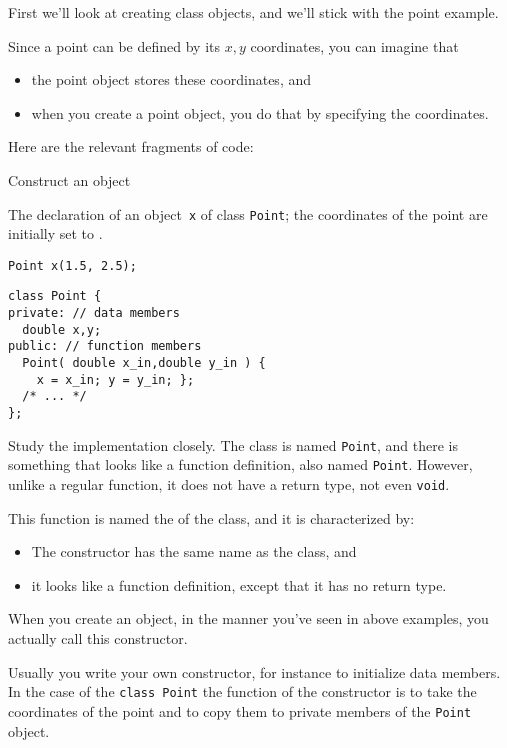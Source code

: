 First we'll look at creating class objects,
and we'll stick with the point example.

Since a point can be defined by its $x,y$ coordinates,
you can imagine that
\begin{itemize}
\item
  the point object stores these coordinates, and
\item when you create a point object, you do that by
  specifying the coordinates.
\end{itemize}

Here are the relevant fragments of code:
\begin{block}{Construct an object}
  \label{sl:point-construct-use}
\begin{multicols}{2}
  The declaration of an object~\lstinline{x}
  of class \lstinline+Point+;
  the coordinates of the point are initially
  set to .
\begin{lstlisting}
Point x(1.5, 2.5);
\end{lstlisting}
%
\columnbreak
%
\begin{lstlisting}
class Point {
private: // data members
  double x,y;
public: // function members
  Point( double x_in,double y_in ) {
    x = x_in; y = y_in; };
  /* ... */
};
\end{lstlisting}
\end{multicols}
\end{block}

Study the implementation closely.
The class is named \lstinline{Point},
and there is something that looks like a function definition,
also named \lstinline{Point}.
However, unlike a regular function, it does not have a return type,
not even \lstinline{void}.

This function is named the  of the class,
and it is characterized by:
\begin{itemize}
\item The constructor has the same name as the class, and
\item it looks like a function definition,
  except that it has no return type.
\end{itemize}
When you create an object,
in the manner you've seen in above examples,
you actually call this constructor.

Usually you write your own constructor,
for instance to initialize data members.
In the case of the \lstinline{class Point}
the function of the constructor is to take the coordinates
of the point and to copy them to private members of the \lstinline{Point} object.

